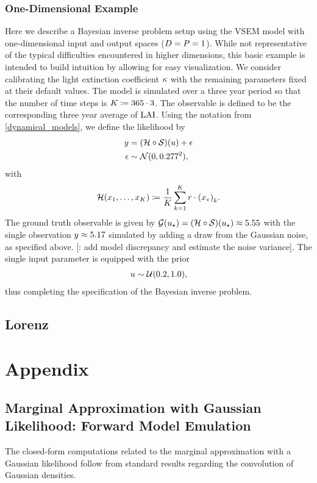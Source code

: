 \documentclass[12pt]{article}
\begin{document}
\subsubsection{One-Dimensional Example} \label{vsem_1d}
Here we describe a Bayesian inverse problem setup using the VSEM model with one-dimensional input and output 
spaces ($\dimPar = \dimObs = 1$). While not representative of the typical difficulties encountered in higher dimensions, 
this basic example is intended to build intuition by allowing for easy visualization. We consider calibrating the light extinction
coefficient $\KEXT$ with the remaining parameters fixed at their default values. The model is simulated over a three year period so 
that the number of time steps is $\NTimeStep \Def 365 \cdot 3$. The observable is defined to be the corresponding three 
year average of $\LAI$. Using the notation from \cref{dynamical_models}, we define the likelihood by 
\begin{align*}
\obs &= (\obsOp \circ \solutionOp)(\Par) + \noise \\
\noise &\sim \Gaussian(0, 0.277^2),
\end{align*}
with
\begin{align*}
\obsOp(\indexTime[1]{\state}, \dots, \indexTime[\NTimeStep]{\state}) 
\Def \frac{1}{\NTimeStep} \sum_{\timeIndex=1}^{\NTimeStep}  \LAR \cdot \indexTime{\left(\stateV\right)}.
\end{align*}
The ground truth observable is given by $\fwd(\ParTrue) = (\obsOp \circ \solutionOp)(\ParTrue) \approx 5.55$ with 
the single observation $\obs \approx 5.17$ simulated by adding a draw from the Gaussian noise, as specified above. 
[\todo: add model discrepancy and estimate the noise variance]. The single input parameter is equipped with the 
prior 
\begin{align*}
\Par \sim \mathcal{U}(0.2, 1.0), 
\end{align*}
thus completing the specification of the Bayesian inverse problem. 

\subsection{Lorenz} \label{lorenz_example}


\section{Appendix}

\subsection{Marginal Approximation with Gaussian Likelihood: Forward Model Emulation}
The closed-form computations related to the marginal approximation with a Gaussian 
likelihood follow from standard results regarding the convolution of Gaussian densities.  
\end{document}
